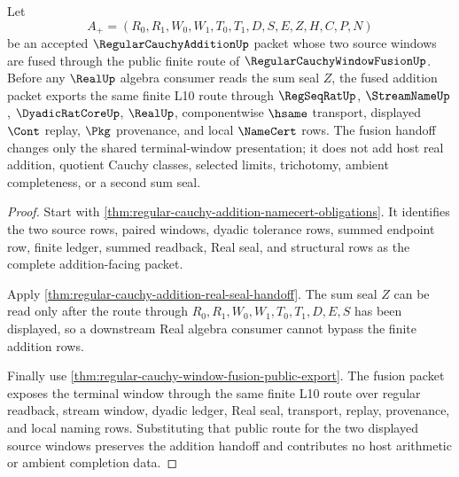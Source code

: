 \begin{theorem}
\label{thm:regular-cauchy-addition-window-fusion-boundary}
Let
$$
A_+=(R_0,R_1,W_0,W_1,T_0,T_1,D,S,E,Z,H,C,P,N)
$$
be an accepted $\RegularCauchyAdditionUp$ packet whose two source windows are
fused through the public finite route of $\RegularCauchyWindowFusionUp$. Before
any $\RealUp$ algebra consumer reads the sum seal $Z$, the fused addition
packet exports the same finite L10 route through $\RegSeqRatUp$,
$\StreamNameUp$, $\DyadicRatCoreUp$, $\RealUp$, componentwise $\hsame$
transport, displayed $\Cont$ replay, $\Pkg$ provenance, and local $\NameCert$
rows. The fusion handoff changes only the shared terminal-window presentation;
it does not add host real addition, quotient Cauchy classes, selected limits,
trichotomy, ambient completeness, or a second sum seal.
\end{theorem}
\begin{proof}
Start with \autoref{thm:regular-cauchy-addition-namecert-obligations}. It
identifies the two source rows, paired windows, dyadic tolerance rows, summed
endpoint row, finite ledger, summed readback, Real seal, and structural rows as
the complete addition-facing packet.

Apply \autoref{thm:regular-cauchy-addition-real-seal-handoff}. The sum seal
$Z$ can be read only after the route through
$R_0,R_1,W_0,W_1,T_0,T_1,D,E,S$ has been displayed, so a downstream Real
algebra consumer cannot bypass the finite addition rows.

Finally use \autoref{thm:regular-cauchy-window-fusion-public-export}. The
fusion packet exposes the terminal window through the same finite L10 route
over regular readback, stream window, dyadic ledger, Real seal, transport,
replay, provenance, and local naming rows. Substituting that public route for
the two displayed source windows preserves the addition handoff and contributes
no host arithmetic or ambient completion data.
\end{proof}


